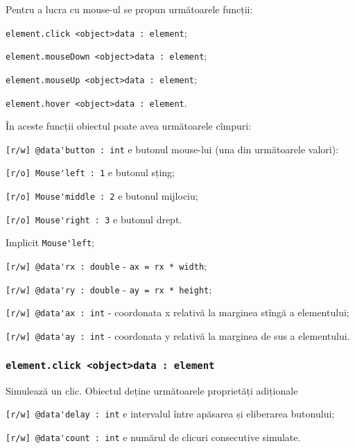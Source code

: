 Pentru a lucra cu mouse-ul se propun următoarele funcții:
\begin{icItems}
	\item \lstinline|element.click <object>data : element|;
	\item \lstinline|element.mouseDown <object>data : element|;
	\item \lstinline|element.mouseUp <object>data : element|;
	\item \lstinline|element.hover <object>data : element|.
\end{icItems}

În aceste funcții obiectul  poate avea următoarele cîmpuri:
\begin{icItems}
	\item \lstinline|[r/w] @data'button : int| e butonul mouse-lui (una din următoarele valori):
	\begin{icItems}
		\item \lstinline|[r/o] Mouse'left : 1| e butonul sțing;
		\item \lstinline|[r/o] Mouse'middle : 2| e butonul mijlociu;
		\item \lstinline|[r/o] Mouse'right : 3| e butonul drept.
	\end{icItems}
	Implicit \lstinline|Mouse'left|;
	\item \lstinline|[r/w] @data'rx : double| - \lstinline|ax = rx * width|;
	\item \lstinline|[r/w] @data'ry : double| - \lstinline|ay = rx * height|;
	\item \lstinline|[r/w] @data'ax : int| - coordonata x relativă la marginea stîngă a elementului;
	\item \lstinline|[r/w] @data'ay : int| - coordonata y relativă la marginea de sus a elementului.
\end{icItems}

\subsubsection{\lstinline|element.click <object>data : element|}

Simulează un clic. Obiectul  deține următoarele proprietăți adiționale
\begin{icItems}
	\item \lstinline|[r/w] @data'delay : int| e intervalul între apăsarea și eliberarea butonului;
	\item \lstinline|[r/w] @data'count : int| e numărul de clicuri consecutive simulate.
\end{icItems}

